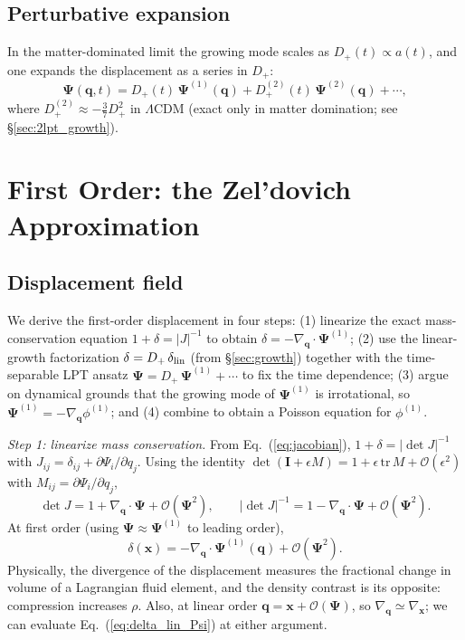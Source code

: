 \documentclass[12pt]{article}
\newcommand{\bq}{\mathbf{q}}
\newcommand{\bx}{\mathbf{x}}
\newcommand{\bPsi}{\boldsymbol{\Psi}}
\newcommand{\Dp}{D_+}
\newcommand{\Dpp}{D_+^{(2)}}
\begin{document}
\subsection{Perturbative expansion}

In the matter-dominated limit the growing mode scales as $\Dp(t)
\propto a(t)$, and one expands the displacement as a series in
$\Dp$:
%
\begin{equation}
  \bPsi(\bq, t)
    = \Dp(t)\,\bPsi^{(1)}(\bq)
    + \Dpp(t)\,\bPsi^{(2)}(\bq)
    + \cdots,
  \label{eq:lpt_expansion}
\end{equation}
%
where $\Dpp \approx -\tfrac{3}{7}\Dp^2$ in $\Lambda$CDM (exact only in
matter domination; see \S\ref{sec:2lpt_growth}).

\section{First Order: the Zel'dovich Approximation}
\label{sec:za}

\subsection{Displacement field}

We derive the first-order displacement in four steps: (1) linearize
the exact mass-conservation equation $1+\delta = |J|^{-1}$ to obtain
$\delta = -\nabla_\bq\cdot\bPsi^{(1)}$; (2) use the linear-growth
factorization $\delta = \Dp\,\delta_{\rm lin}$ (from
\S\ref{sec:growth}) together with the time-separable LPT ansatz
$\bPsi = \Dp\,\bPsi^{(1)} + \cdots$ to fix the time dependence; (3)
argue on dynamical grounds that the growing mode of $\bPsi^{(1)}$ is
irrotational, so $\bPsi^{(1)} = -\nabla_\bq\phi^{(1)}$; and (4)
combine to obtain a Poisson equation for $\phi^{(1)}$.

\emph{Step 1: linearize mass conservation.}  From
Eq.~(\ref{eq:jacobian}), $1+\delta = |\det J|^{-1}$ with
$J_{ij} = \delta_{ij} + \partial\Psi_i/\partial q_j$.  Using the
identity $\det(\mathbf{I} + \epsilon M) = 1 + \epsilon\,\mathrm{tr}\,M +
\mathcal{O}(\epsilon^2)$ with $M_{ij}=\partial\Psi_i/\partial q_j$,
%
\begin{equation}
  \det J = 1 + \nabla_\bq\!\cdot\!\bPsi + \mathcal{O}(\bPsi^2),
  \qquad
  |\det J|^{-1} = 1 - \nabla_\bq\!\cdot\!\bPsi + \mathcal{O}(\bPsi^2).
\end{equation}
%
At first order (using $\bPsi \approx \bPsi^{(1)}$ to leading order),
%
\begin{equation}
  \delta(\bx) = -\nabla_\bq\!\cdot\!\bPsi^{(1)}(\bq) + \mathcal{O}(\bPsi^2).
  \label{eq:delta_lin_Psi}
\end{equation}
%
Physically, the divergence of the displacement measures the
fractional change in volume of a Lagrangian fluid element, and the
density contrast is its opposite: compression increases $\rho$.
Also, at linear order $\bq = \bx + \mathcal{O}(\bPsi)$, so
$\nabla_\bq \simeq \nabla_\bx$; we can evaluate
Eq.~(\ref{eq:delta_lin_Psi}) at either argument.
\end{document}
